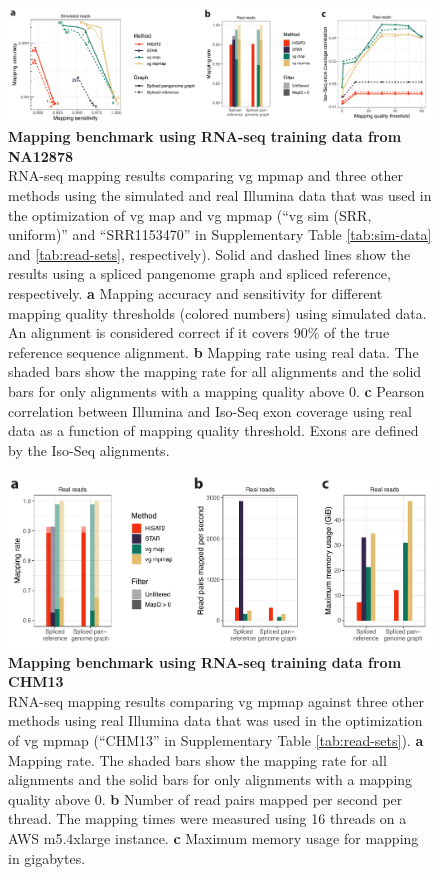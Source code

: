 \documentclass[11pt]{ucthesis}
\begin{document}
\begin{figure}[H]
\ssp
\begin{center}
\includegraphics[width=\textwidth]{mpmapfigures/figureS3.pdf}
\caption{\textbf{Mapping benchmark using RNA-seq training data from NA12878} \\
RNA-seq mapping results comparing vg mpmap and three other methods using the simulated and real Illumina data that was used in the optimization of vg map and vg mpmap (``vg sim (SRR, uniform)'' and ``SRR1153470'' in Supplementary Table \ref{tab:sim-data} and \ref{tab:read-sets}, respectively). Solid and dashed lines show the results using a spliced pangenome graph and spliced reference, respectively. \textbf{a} Mapping accuracy and sensitivity for different mapping quality thresholds (colored numbers) using simulated data. An alignment is considered correct if it covers 90\% of the true reference sequence alignment. \textbf{b} Mapping rate using real data. The shaded bars show the mapping rate for all alignments and the solid bars for only alignments with a mapping quality above 0. \textbf{c} Pearson correlation between Illumina and Iso-Seq exon coverage using real data as a function of mapping quality threshold. Exons are defined by the Iso-Seq alignments.
} \label{fig:mapping-srr}
\end{center}
\end{figure}

\begin{figure}[H]
\ssp
\begin{center}
\includegraphics[width=\textwidth]{mpmapfigures/figureS4.pdf}
\caption{\textbf{Mapping benchmark using RNA-seq training data from CHM13} \\
RNA-seq mapping results comparing vg mpmap against three other methods using real Illumina data that was used in the optimization of vg mpmap (``CHM13'' in Supplementary Table \ref{tab:read-sets}). \textbf{a} Mapping rate. The shaded bars show the mapping rate for all alignments and the solid bars for only alignments with a mapping quality above 0. \textbf{b} Number of read pairs mapped per second per thread. The mapping times were measured using 16 threads on a AWS m5.4xlarge instance. \textbf{c} Maximum memory usage for mapping in gigabytes. 
} \label{fig:mapping-t2t}
\end{center}
\end{figure}
\end{document}
